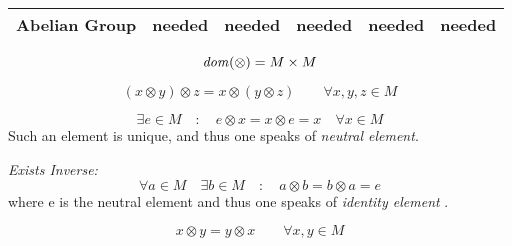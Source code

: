 \documentclass[a4paper,12pt]{scrartcl}    %
\newcommand{\OpA}{\otimes}
\begin{document}
\begin{landscape}
\begin{minipage}[t][]{0.60 \linewidth}
\begin{center}
\begin{tabular}{|c|c|c|c|c|c|}
    		\cellcolor{blue!25} Abelian Group & \cellcolor{green!25} needed & \cellcolor{green!25} needed &  \cellcolor{green!25} needed &  \cellcolor{green!25} needed &   \cellcolor{green!25} needed \\
    		\hline
    	\end{tabular}
    	\end{center}
		\begin{definition}
			\begin{equation}\label{Totality}
				\dom(\OpA) = M \times M
			\end{equation}
		\end{definition}
		\vfill
		\begin{definition}
			\begin{equation}\label{Associativity}
				(x \OpA y) \OpA z = x \OpA (y \OpA z) \qquad \forall x,y,z \in M
			\end{equation}	
		\end{definition}
		\vfill
		\begin{definition}
			\begin{equation}\label{Identity}
				\exists e \in M \quad : \quad e \OpA x = x \OpA e = x \quad \forall x \in M
			\end{equation}
			Such an element is unique, and thus one speaks of \emph{neutral element}.	
		\end{definition}
		\vfill
		\begin{definition}
			\emph{Exists Inverse:}
				\begin{equation}\label{Invertibility}
					\forall a \in M \quad \exists b \in M \quad : \quad a \OpA b = b \OpA a = e
				\end{equation}
			where e is the neutral element and thus one speaks of \emph{identity element} .
		\end{definition}
		\vfill
		\begin{definition}
			\begin{equation}\label{Commutativity}
				x \OpA y = y \OpA x \qquad \forall x,y\in M
			\end{equation}
		\end{definition}
		\vfill			
	\end{minipage}
		




\end{landscape}
\end{document}
